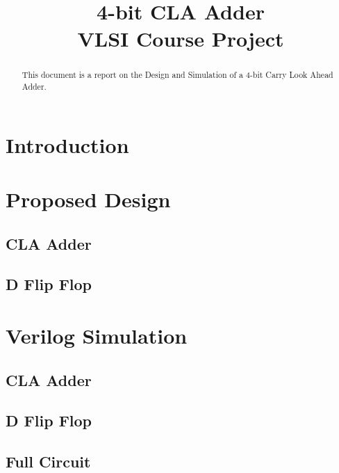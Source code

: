 \documentclass[conference]{IEEEtran}
\begin{document}
\title{4-bit CLA Adder \\ VLSI Course Project}

\author{
}

\maketitle

\begin{abstract}
This document is a report on the Design and Simulation of a 4-bit Carry Look Ahead Adder.
\end{abstract}


\section{Introduction}

\section{Proposed Design}

\subsection{CLA Adder}

\subsection{D Flip Flop}

\section{Verilog Simulation}

\subsection{CLA Adder}

\subsection{D Flip Flop}

\subsection{Full Circuit}
\end{document}
